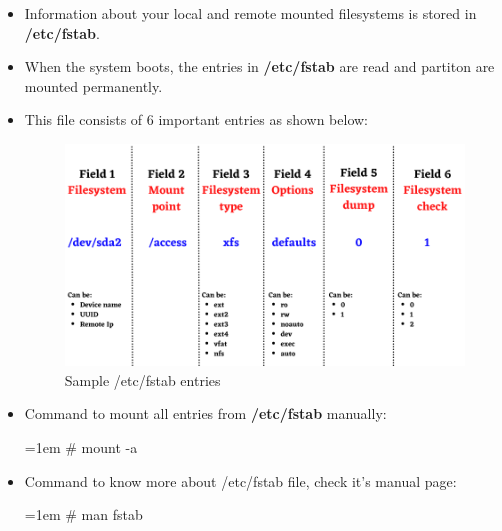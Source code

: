 \setlength{\columnsep}{3pt}
\begin{flushleft}
	
\begin{itemize}
	\item Information about your local and remote mounted filesystems is stored in \textbf{/etc/fstab}.
	\item When the system boots, the entries in \textbf{/etc/fstab} are read and partiton are mounted permanently.
	\item This file consists of 6 important entries as shown below:
	
	\begin{figure}[h!]
		\centering
		\includegraphics[scale=.5]{content/chapter8/images/fstab2.png}
		\caption{Sample /etc/fstab entries}
		\label{fstab}
	\end{figure}	
	
	\item Command to mount all entries from \textbf{/etc/fstab} manually:
	\bigskip
	\begin{tcolorbox}[breakable,notitle,boxrule=-0pt,colback=black,colframe=black]
		\color{green}
		\font=1em
		\# mount -a
		\font=4pt
	\end{tcolorbox}
	
	\item Command to know more about /etc/fstab file, check it's manual page:
	\begin{tcolorbox}[breakable,notitle,boxrule=-0pt,colback=black,colframe=black]
		\color{green}
		\font=1em
		\# man fstab
		\font=4pt
	\end{tcolorbox}
	
\end{itemize}

\newpage

\end{flushleft}
